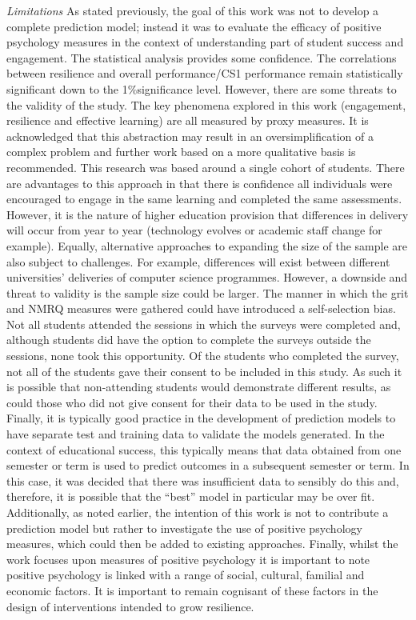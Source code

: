 \documentclass[sigconf]{acmart}
\begin{document}
{\em Limitations}
As stated previously, the goal of this work was not to develop a complete prediction model; instead it was to evaluate the efficacy of positive psychology measures in the context of understanding part of student success and engagement. The statistical analysis provides some confidence. The correlations between resilience and overall performance/CS1 performance remain statistically significant down to the 1\%significance level. However, there are some threats to the validity of the study. The key phenomena explored in this work (engagement, resilience and effective learning) are all measured by proxy measures. It is acknowledged that this abstraction may result in an oversimplification of a complex problem and further work based on a more qualitative basis is recommended. This research was based around a single cohort of students. There are advantages to this approach in that there is confidence all individuals were encouraged to engage in the same learning and completed the same assessments. However, it is the nature of higher education provision that differences in delivery will occur from year to year (technology evolves or academic staff change for example). Equally, alternative approaches to expanding the size of the sample are also subject to challenges. For example, differences will exist between different universities' deliveries of computer science programmes. However, a downside and threat to validity is the sample size could be larger. The manner in which the grit and NMRQ measures were gathered could have introduced a self-selection bias. Not all students attended the sessions in which the surveys were completed and, although students did have the option to complete the surveys outside the sessions, none took this opportunity. Of the students who completed the survey, not all of the students gave their consent to be included in this study. As such it is possible that non-attending students would demonstrate different results, as could those who did not give consent for their data to be used in the study. Finally, it is typically good practice in the development of prediction models to have separate test and training data to validate the models generated. In the context of educational success, this typically means that data obtained from one semester or term is used to predict outcomes in a subsequent semester or term. In this case, it was decided that there was insufficient data to sensibly do this and, therefore, it is possible that the ``best'' model in particular may be over fit. Additionally, as noted earlier, the intention of this work is not to contribute a prediction model but rather to investigate the use of positive psychology measures, which could then be added to existing approaches.  Finally, whilst the work focuses upon measures of positive psychology it is important to note positive psychology is linked with a range of social, cultural, familial and economic factors. It is important to remain cognisant of these factors in the design of interventions intended to grow resilience.
\end{document}
